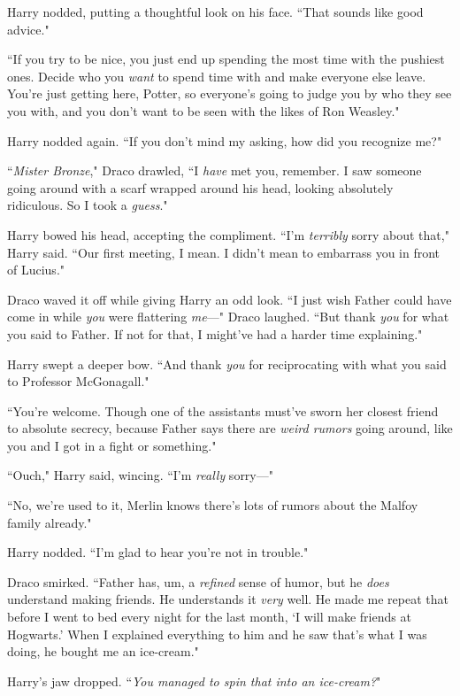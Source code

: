 Harry nodded, putting a thoughtful look on his face. ``That sounds like good advice."

``If you try to be nice, you just end up spending the most time with the pushiest ones. Decide who you \emph{want} to spend time with and make everyone else leave. You're just getting here, Potter, so everyone's going to judge you by who they see you with, and you don't want to be seen with the likes of Ron Weasley."

Harry nodded again. ``If you don't mind my asking, how did you recognize me?"

``\emph{Mister Bronze}," Draco drawled, ``I \emph{have} met you, remember. I saw someone going around with a scarf wrapped around his head, looking absolutely ridiculous. So I took a \emph{guess}."

Harry bowed his head, accepting the compliment. ``I'm \emph{terribly} sorry about that," Harry said. ``Our first meeting, I mean. I didn't mean to embarrass you in front of Lucius."

Draco waved it off while giving Harry an odd look. ``I just wish Father could have come in while \emph{you} were flattering \emph{me}—" Draco laughed. ``But thank \emph{you} for what you said to Father. If not for that, I might've had a harder time explaining."

Harry swept a deeper bow. ``And thank \emph{you} for reciprocating with what you said to Professor McGonagall."

``You're welcome. Though one of the assistants must've sworn her closest friend to absolute secrecy, because Father says there are \emph{weird rumors} going around, like you and I got in a fight or something."

``Ouch," Harry said, wincing. ``I'm \emph{really} sorry—"

``No, we're used to it, Merlin knows there's lots of rumors about the Malfoy family already."

Harry nodded. ``I'm glad to hear you're not in trouble."

Draco smirked. ``Father has, um, a \emph{refined} sense of humor, but he \emph{does} understand making friends. He understands it \emph{very} well. He made me repeat that before I went to bed every night for the last month, `I will make friends at Hogwarts.' When I explained everything to him and he saw that's what I was doing, he bought me an ice-cream."

Harry's jaw dropped. ``\emph{You managed to spin that into an ice-cream?}"


